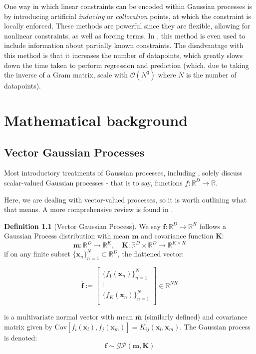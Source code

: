 \documentclass[12pt,a4paper,twoside]{report}
\theoremstyle{definition}
\newtheorem{definition}[thm]{Definition}
\begin{document}
One way in which linear constraints can be encoded within Gaussian processes is by introducing artificial \emph{inducing} or \emph{collocation} points, at which the constraint is locally enforced. These methods are powerful since they are flexible, allowing for nonlinear constraints, as well as forcing terms. In \cite{long}, this method is even used to include information about partially known constraints. The disadvantage with this method is that it increases the number of datapoints, which greatly slows down the time taken to perform regression and prediction (which, due to taking the inverse of a Gram matrix, scale with $\mathcal O(N^3)$ where $N$ is the number of datapoints).

\chapter{Mathematical background}
\section{Vector Gaussian Processes}
\raggedright Most introductory treatments of Gaussian processes, including \cite{rasmussen}, solely discuss scalar-valued Gaussian processes - that is to say, functions $f:\mathbb{R}^D\to\mathbb{R}$.

Here, we are dealing with vector-valued processes, so it is worth outlining what that means. A more comprehensive review is found in \cite{alvarez}.

\begin{definition}[Vector Gaussian Process]\label{vectorGP}
	We say $\mathbf f:\mathbb{R}^D\to\mathbb{R}^K$ follows a Gaussian Process distribution with mean $\mathbf m$ and covariance function $\mathbf K$:
	$$\mathbf m:\mathbb{R}^D\to\mathbb{R}^K, \quad \mathbf K:\mathbb{R}^D\times \mathbb{R}^D\to\mathbb{R}^{K\times K}$$
	if on any finite subset $\{\mathbf x_n\}_{n=1}^N \subset\mathbb{R}^D$, the flattened vector:

	$$ \mathbf {\bar f}:= \begin{bmatrix}
	\{f_1(\mathbf x_n)\}_{n=1}^N \\ 
	\vdots \\ 
	\{f_K(\mathbf x_n)\}_{n=1}^N\\
\end{bmatrix}\in \mathbb{R}^{NK}$$	

is a multivariate normal vector with mean $\mathbf {\bar m}$ (similarly defined) and covariance matrix given by $\text{Cov}[f_i(\mathbf x_l),f_j(\mathbf x_m)]= K_{ij}(\mathbf x_l,\mathbf x_m)$. 
The Gaussian process is denoted:
$$\mathbf f\sim \mathcal{GP}(\mathbf m, \mathbf  K)$$
\end{definition}
\end{document}
